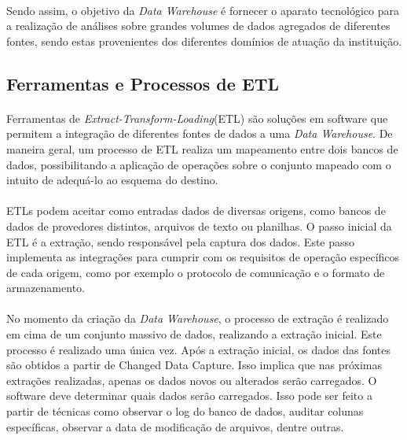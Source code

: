 \paragraph{} Sendo assim, o objetivo da \textit{Data Warehouse} é fornecer o aparato tecnológico para a realização de análises sobre grandes volumes de dados agregados de diferentes fontes, sendo estas provenientes dos diferentes domínios de atuação da instituição.

\subsection{Ferramentas e Processos de ETL} 

\paragraph{} Ferramentas de \textit{Extract-Transform-Loading}(ETL) são soluções em software que permitem a integração de diferentes fontes de dados a uma \textit{Data Warehouse}.
De maneira geral, um processo de ETL realiza um mapeamento entre dois bancos de dados, possibilitando a aplicação de operações sobre o conjunto mapeado com o intuito de adequá-lo ao esquema do destino.

\paragraph{} ETLs podem aceitar como entradas dados de diversas origens, como bancos de dados de provedores distintos, arquivos de texto ou planilhas. O passo inicial da ETL é a extração, sendo responsável pela captura dos dados. Este passo implementa as integrações para cumprir com os requisitos de operação específicos de cada origem, como por exemplo o protocolo de comunicação e o formato de armazenamento.

\paragraph{} No momento da criação da \textit{Data Warehouse}, o processo de extração é realizado em cima de um conjunto massivo de dados, realizando a extração inicial. Este processo é realizado uma única vez. \cite{kimball2008data} Após a extração inicial, os dados das fontes são obtidos a partir de Changed Data Capture. Isso implica que nas próximas extrações realizadas, apenas os dados novos ou alterados serão carregados. O software deve determinar quais dados serão carregados. Isso pode ser feito a partir de técnicas como observar o log do banco de dados, auditar colunas específicas, observar a data de modificação de arquivos, dentre outras.

